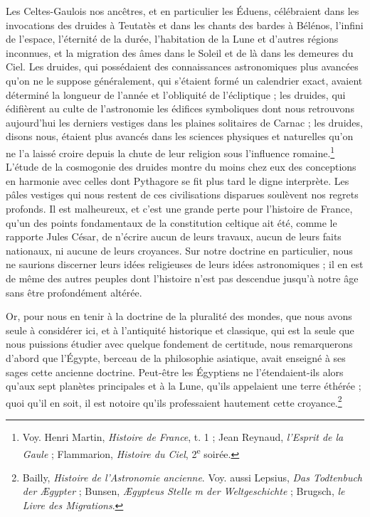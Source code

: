 \documentclass[a4paper, 11pt, oneside, landscape]{article}
\begin{document}
Les Celtes-Gaulois nos ancêtres, et en particulier les Éduens, célébraient dans les invocations des druides à Teutatès et dans les chants des bardes à Bélénos, l'infini de l'espace, l'éternité de la durée, l'habitation de la Lune et d'autres régions inconnues, et la migration des âmes dans le Soleil et de là dans les demeures du Ciel. Les druides, qui possédaient des connaissances astronomiques plus avancées qu'on ne le suppose généralement, qui s'étaient formé un calendrier exact, avaient déterminé la longueur de l'année et l'obliquité de l'écliptique ; les druides, qui édifièrent au culte de l'astronomie les édifices symboliques dont nous retrouvons aujourd'hui les derniers vestiges dans les plaines solitaires de Carnac ; les druides, disons nous, étaient plus avancés dans les sciences physiques et naturelles qu'on ne l'a laissé croire depuis la chute de leur religion sous l'influence romaine.\footnote{Voy. Henri Martin, \emph{Histoire de France}, t. 1 ; Jean Reynaud, \emph{l'Esprit de la Gaule} ; Flammarion, \emph{Histoire du Ciel}, 2\textsuperscript{e} soirée.} L'étude de la cosmogonie des druides montre du moins chez eux des conceptions en harmonie avec celles dont Pythagore se fit plus tard le digne interprète. Les pâles vestiges qui nous restent de ces civilisations disparues soulèvent nos regrets profonds. Il est malheureux, et c'est une grande perte pour l'histoire de France, qu'un des points fondamentaux de la constitution celtique ait été, comme le rapporte Jules César, de n'écrire aucun de leurs travaux, aucun de leurs faits nationaux, ni aucune de leurs croyances. Sur notre doctrine en particulier, nous ne saurions discerner leurs idées religieuses de leurs idées astronomiques ; il en est de même des autres peuples dont l'histoire n'est pas descendue jusqu'à notre âge sans être profondément altérée.

Or, pour nous en tenir à la doctrine de la pluralité des mondes, que nous avons seule à considérer ici, et à l'antiquité historique et classique, qui est la seule que nous puissions étudier avec quelque fondement de certitude, nous remarquerons d'abord que l'Égypte, berceau de la philosophie asiatique, avait enseigné à ses sages cette ancienne doctrine. Peut-être les Égyptiens ne l'étendaient-ils alors qu'aux sept planètes principales et à la Lune, qu'ils appelaient une terre éthérée ; quoi qu'il en soit, il est notoire qu'ils professaient hautement cette croyance.\footnote{Bailly, \emph{Histoire de l'Astronomie ancienne}. Voy. aussi Lepsius, \emph{Das Todtenbuch der Ægypter} ; Bunsen, \emph{Ægypteus Stelle m der Weltgeschichte} ; Brugsch, \emph{le Livre des Migrations}.}
\end{document}
